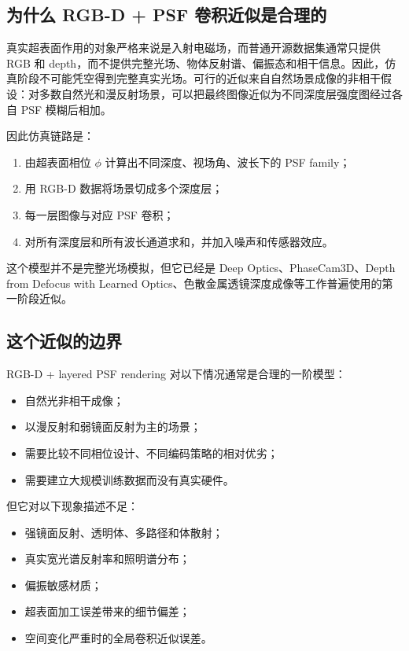 \documentclass[11pt,a4paper,fontset=none]{ctexart}
\begin{document}
\subsection{为什么 RGB-D + PSF 卷积近似是合理的}

真实超表面作用的对象严格来说是入射电磁场，而普通开源数据集通常只提供 RGB 和 depth，而不提供完整光场、物体反射谱、偏振态和相干信息。因此，仿真阶段不可能凭空得到完整真实光场。可行的近似来自自然场景成像的非相干假设：对多数自然光和漫反射场景，可以把最终图像近似为不同深度层强度图经过各自 PSF 模糊后相加。

因此仿真链路是：
\begin{enumerate}
  \item 由超表面相位 $\phi$ 计算出不同深度、视场角、波长下的 PSF family；
  \item 用 RGB-D 数据将场景切成多个深度层；
  \item 每一层图像与对应 PSF 卷积；
  \item 对所有深度层和所有波长通道求和，并加入噪声和传感器效应。
\end{enumerate}

这个模型并不是完整光场模拟，但它已经是 Deep Optics、PhaseCam3D、Depth from Defocus with Learned Optics、色散金属透镜深度成像等工作普遍使用的第一阶段近似。

\subsection{这个近似的边界}

RGB-D + layered PSF rendering 对以下情况通常是合理的一阶模型：
\begin{itemize}
  \item 自然光非相干成像；
  \item 以漫反射和弱镜面反射为主的场景；
  \item 需要比较不同相位设计、不同编码策略的相对优劣；
  \item 需要建立大规模训练数据而没有真实硬件。
\end{itemize}

但它对以下现象描述不足：
\begin{itemize}
  \item 强镜面反射、透明体、多路径和体散射；
  \item 真实宽光谱反射率和照明谱分布；
  \item 偏振敏感材质；
  \item 超表面加工误差带来的细节偏差；
  \item 空间变化严重时的全局卷积近似误差。
\end{itemize}
\end{document}
